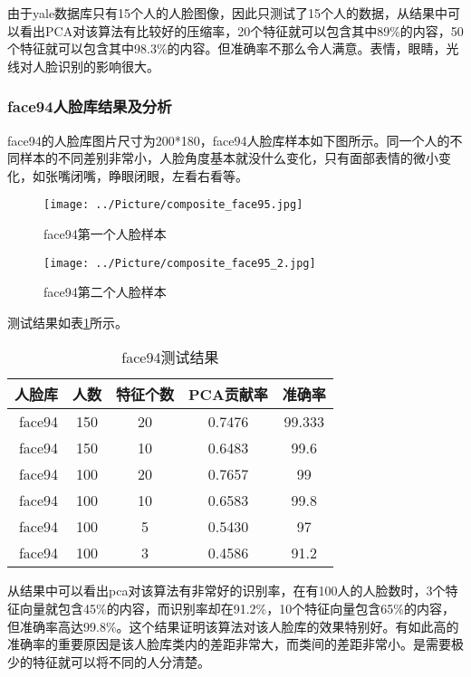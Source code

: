 \documentclass[a4paper,12pt]{ctexart}
\begin{document}
由于yale数据库只有15个人的人脸图像，因此只测试了15个人的数据，从结果中可以看出PCA对该算法有比较好的压缩率，20个特征就可以包含其中89\%的内容，50个特征就可以包含其中98.3\%的内容。但准确率不那么令人满意。表情，眼睛，光线对人脸识别的影响很大。


\subsubsection{face94人脸库结果及分析}

face94的人脸库图片尺寸为200*180，face94人脸库样本如下图所示。同一个人的不同样本的不同差别非常小，人脸角度基本就没什么变化，只有面部表情的微小变化，如张嘴闭嘴，睁眼闭眼，左看右看等。

\begin{figure}[htb]
\begin{minipage}[t]{0.5\linewidth}
\centering
\texttt{[image: ../Picture/composite\_face95.jpg]}
\caption{face94第一个人脸样本}
\end{minipage}%
\begin{minipage}[t]{0.5\linewidth}
\centering
\texttt{[image: ../Picture/composite\_face95\_2.jpg]}
\caption{face94第二个人脸样本}
\end{minipage}
\end{figure}



测试结果如表\ref{tab:face94}所示。
\begin{table}[!htb]
  \centering
\begin{tabular}{|r|c|c|c|c|}
\hline
人脸库&人数&特征个数&PCA贡献率&准确率\\
\hline
face94 & 150&    20&     0.7476& 99.333\\
  face94&  150&    10&     0.6483& 99.6\\
  \hline
face94&  100&    20&     0.7657& 99\\
face94 & 100&    10&     0.6583& 99.8\\
face94  &100&    5&      0.5430& 97\\
face94 & 100&    3&      0.4586& 91.2\\
  \hline
\end{tabular}
  \caption{face94测试结果}
  \label{tab:face94}
\end{table}

从结果中可以看出pca对该算法有非常好的识别率，在有100人的人脸数时，3个特征向量就包含45\%的内容，而识别率却在91.2\%，10个特征向量包含65\%的内容，但准确率高达99.8\%。这个结果证明该算法对该人脸库的效果特别好。有如此高的准确率的重要原因是该人脸库类内的差距非常大，而类间的差距非常小。是需要极少的特征就可以将不同的人分清楚。
\end{document}
